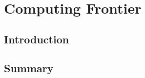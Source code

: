  
\chapter{Computing Frontier}
\label{chap:Computing}


\begin{center}\begin{boldmath}



\end{boldmath}\end{center}


\section{Introduction}
\label{sec:comp-intro}


\section{Summary}
\label{sec:comp-summary}





